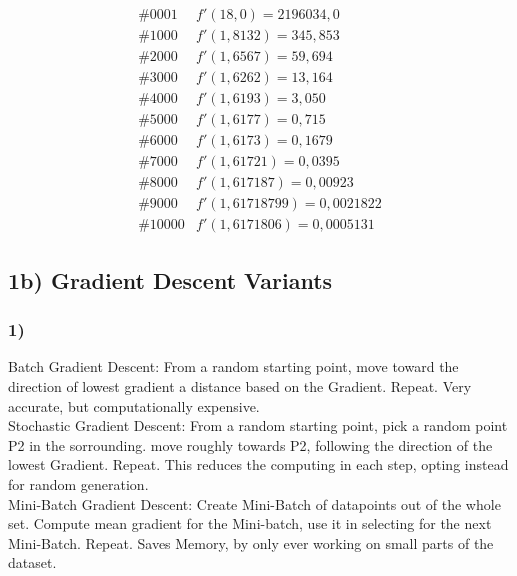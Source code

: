 \documentclass{article}
\begin{document}
		\begin{align*}
			\#0001 & f'(18,0) = 2196034,0\\
			\#1000 & f'( 1,8132) = 345,853\\
			\#2000 & f'( 1,6567) = 59,694\\
			\#3000 & f'( 1,6262) = 13,164\\
			\#4000 & f'( 1,6193) = 3,050\\
			\#5000 & f'( 1,6177) = 0,715\\
			\#6000 & f'( 1,6173) = 0,1679\\
			\#7000 & f'( 1,61721) = 0,0395\\
			\#8000 & f'( 1,617187) = 0,00923\\
			\#9000 & f'( 1,61718799) = 0,0021822\\
			\#10000 & f'(1,6171806) = 0,0005131
		\end{align*}

\subsection{1b) Gradient Descent Variants}
\subsubsection{1)}
	Batch Gradient Descent: From a random starting point, move toward the direction of lowest gradient a distance based on the Gradient. Repeat. Very accurate, but computationally expensive.\\
	Stochastic Gradient Descent: From a random starting point, pick a random point P2 in the sorrounding. move roughly towards P2, following the direction of the lowest Gradient. Repeat. This reduces the computing in each step, opting instead for random generation. \\
	Mini-Batch Gradient Descent: Create Mini-Batch of datapoints out of the whole set. Compute mean gradient for the Mini-batch, use it in selecting for the next Mini-Batch. Repeat. Saves Memory, by only ever working on small parts of the dataset.
	
\end{document}
